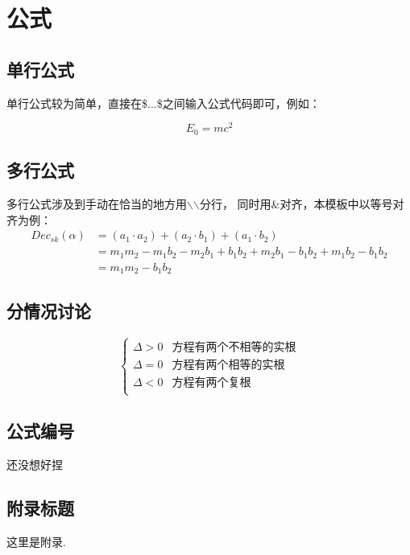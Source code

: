 \documentclass[12pt, a4paper, oneside]{ctexart}
\begin{document}
\section{公式}
\subsection{单行公式}
单行公式较为简单，直接在\$...\$之间输入公式代码即可，例如：\par
\begin{equation}
    E_0=mc^2
\end{equation}

\subsection{多行公式}
多行公式涉及到手动在恰当的地方用$\backslash$$\backslash$分行，
同时用\&对齐，本模板中以等号对齐为例：\\
\begin{equation}
    \begin{split}
        Dec_{sk}(\alpha)&=(a_1\cdot a_2)+(a_2\cdot b_1)+(a_1\cdot b_2)\\
        &= m_1m_2-m_1b_2-m_2b_1+b_1b_2+m_2b_1-b_1b_2+m_1b_2-b_1b_2\\
        &= m_1m_2-b_1b_2
    \end{split}
\end{equation}
\subsection{分情况讨论}

$$
    \begin{cases}
        \Delta >0 & \text{方程有两个不相等的实根} \\
        \Delta =0 & \text{方程有两个相等的实根}  \\
        \Delta <0 & \text{方程有两个复根}     \\
    \end{cases}
$$
\subsection{公式编号}
还没想好捏


\newpage

\printbibliography[title=参考文献]

\begin{appendices}
    \renewcommand{\thesection}{\Alph{section}}
    \section{附录标题}
    这里是附录.
\end{appendices}
\end{document}
